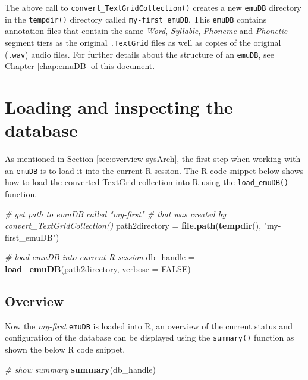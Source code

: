\documentclass[]{book}
\newenvironment{Shaded}{\begin{snugshade}}{\end{snugshade}}
\newcommand{\CommentTok}[1]{\textcolor[rgb]{0.56,0.35,0.01}{\textit{#1}}}
\newcommand{\DataTypeTok}[1]{\textcolor[rgb]{0.13,0.29,0.53}{#1}}
\newcommand{\KeywordTok}[1]{\textcolor[rgb]{0.13,0.29,0.53}{\textbf{#1}}}
\newcommand{\NormalTok}[1]{#1}
\newcommand{\OtherTok}[1]{\textcolor[rgb]{0.56,0.35,0.01}{#1}}
\newcommand{\StringTok}[1]{\textcolor[rgb]{0.31,0.60,0.02}{#1}}
\begin{document}
The above call to \texttt{convert\_TextGridCollection()} creates a new \texttt{emuDB} directory in the \texttt{tempdir()} directory called \texttt{my-first\_emuDB}. This \texttt{emuDB} contains annotation files that contain the same \emph{Word}, \emph{Syllable}, \emph{Phoneme} and \emph{Phonetic} segment tiers as the original \texttt{.TextGrid} files as well as copies of the original (\texttt{.wav}) audio files. For further details about the structure of an \texttt{emuDB}, see Chapter \ref{chap:emuDB} of this document.

\hypertarget{loading-and-inspecting-the-database}{%
\section{Loading and inspecting the database}\label{loading-and-inspecting-the-database}}

As mentioned in Section \ref{sec:overview-sysArch}, the first step when working with an \texttt{emuDB} is to load it into the current R session. The R code snippet below shows how to load the converted TextGrid collection into R using the \texttt{load\_emuDB()} function.

\begin{Shaded}
\begin{Highlighting}[]
\CommentTok{# get path to emuDB called "my-first"}
\CommentTok{# that was created by convert_TextGridCollection()}
\NormalTok{path2directory =}\StringTok{ }\KeywordTok{file.path}\NormalTok{(}\KeywordTok{tempdir}\NormalTok{(), }\StringTok{"my-first_emuDB"}\NormalTok{)}

\CommentTok{# load emuDB into current R session}
\NormalTok{db_handle =}\StringTok{ }\KeywordTok{load_emuDB}\NormalTok{(path2directory, }\DataTypeTok{verbose =} \OtherTok{FALSE}\NormalTok{)}
\end{Highlighting}
\end{Shaded}

\hypertarget{overview}{%
\subsection{Overview}\label{overview}}

Now the \emph{my-first} \texttt{emuDB} is loaded into R, an overview of the current status and configuration of the database can be displayed using the \texttt{summary()} function as shown the below R code snippet.

\begin{Shaded}
\begin{Highlighting}[]
\CommentTok{# show summary}
\KeywordTok{summary}\NormalTok{(db_handle)}
\end{Highlighting}
\end{Shaded}
\end{document}
